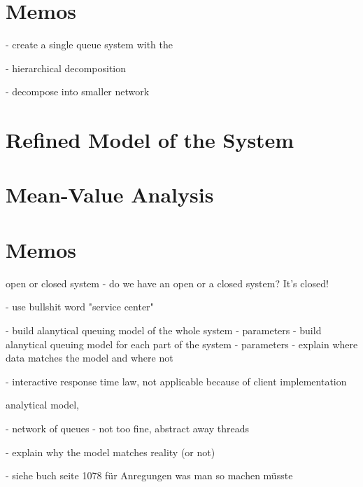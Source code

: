 \documentclass[a4paper]{article}
\begin{document}
\section{Memos}

- create a single queue system with the 

- hierarchical decomposition

- decompose into smaller network

\section{Refined Model of the System}

\section{Mean-Value Analysis}


\section{Memos}

open or closed system
- do we have an open or a closed system? It's closed!

- use bullshit word "service center"

- build alanytical queuing model of the whole system
  - parameters
- build alanytical queuing model for each part of the system
  - parameters
- explain where data matches the model and where not

- interactive response time law, not applicable because of client implementation

analytical model, 


- network of queues
  - not too fine, abstract away threads
  
  
- explain why the model matches reality (or not)


- siehe buch seite 1078 für Anregungen was man so machen müsste
\end{document}
